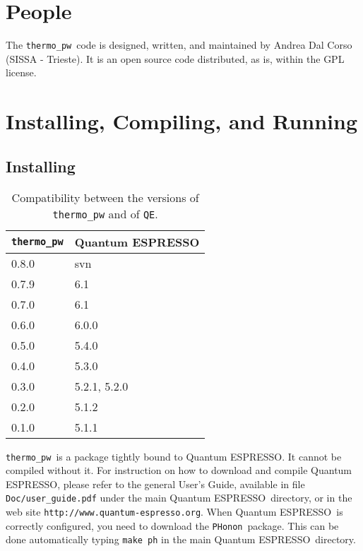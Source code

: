 \documentclass[12pt,a4paper]{article}
\def\qe{{\sc Quantum ESPRESSO}}
\def\PHonon{\texttt{PHonon}}
\def\thermo{\texttt{thermo\_pw}}
\begin{document}
\newpage
\section{\color{coral}People}
The \thermo\ code is designed, written, and maintained by Andrea Dal Corso 
(SISSA - Trieste). It is an open source code distributed, as is, within the GPL
license.  

\newpage
\section{\color{coral}Installing, Compiling, and Running}

\subsection{\color{web-blue}Installing}
\begin{table}
\begin{center}
\begin{tabular}{ll}
\hline
\hline
\texttt{thermo\_pw} & \qe  \\
\hline
0.8.0 & svn \\
0.7.9 & 6.1 \\
0.7.0 & 6.1 \\
0.6.0 & 6.0.0 \\
0.5.0 & 5.4.0 \\
0.4.0 & 5.3.0 \\
0.3.0 & 5.2.1, 5.2.0 \\
0.2.0 & 5.1.2 \\
0.1.0 & 5.1.1 \\
\hline
\hline
\end{tabular}
\caption{Compatibility between the versions of 
\texttt{thermo\_pw} and of \texttt{QE}.}
\end{center}
\end{table}

\thermo\ is a package tightly bound to \qe. It cannot be compiled without
it. For instruction on how to download and compile \qe, please 
refer to the general User's Guide, available in file \texttt{Doc/user\_guide.pdf}
under the main \qe\ directory, or in the web site 
\texttt{http://www.quantum-espresso.org}.
When \qe\ is correctly configured, you need to download the \PHonon\ 
package. This can be done automatically typing \texttt{make ph} in
the main \qe\ directory.
\end{document}
